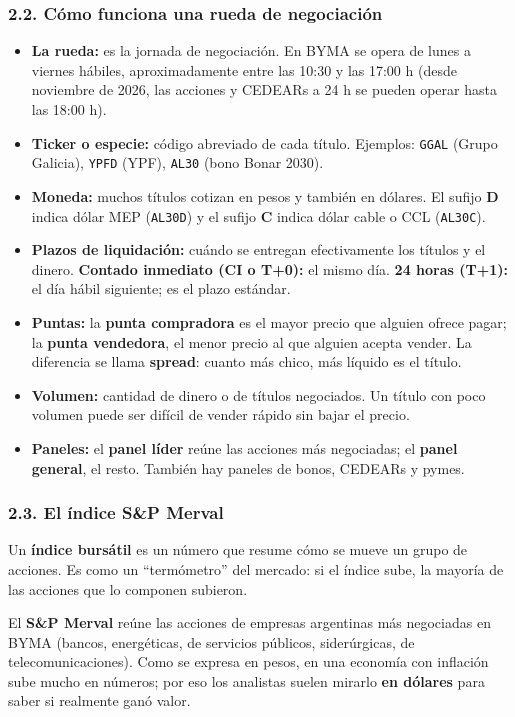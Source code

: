 \subsubsection*{2.2. Cómo funciona una rueda de negociación}
\begin{itemize}
  \item \textbf{La rueda:} es la jornada de negociación. En BYMA se opera de lunes a viernes
        hábiles, aproximadamente entre las 10:30 y las 17:00 h (desde noviembre de 2026, las
        acciones y CEDEARs a 24 h se pueden operar hasta las 18:00 h).
  \item \textbf{Ticker o especie:} código abreviado de cada título. Ejemplos: \texttt{GGAL}
        (Grupo Galicia), \texttt{YPFD} (YPF), \texttt{AL30} (bono Bonar 2030).
  \item \textbf{Moneda:} muchos títulos cotizan en pesos y también en dólares. El sufijo
        \textbf{D} indica dólar MEP (\texttt{AL30D}) y el sufijo \textbf{C} indica dólar cable
        o CCL (\texttt{AL30C}).
  \item \textbf{Plazos de liquidación:} cuándo se entregan efectivamente los títulos y el dinero.
        \textbf{Contado inmediato (CI o T+0):} el mismo día. \textbf{24 horas (T+1):} el día hábil
        siguiente; es el plazo estándar.
  \item \textbf{Puntas:} la \textbf{punta compradora} es el mayor precio que alguien ofrece
        pagar; la \textbf{punta vendedora}, el menor precio al que alguien acepta vender. La
        diferencia se llama \textbf{spread}: cuanto más chico, más líquido es el título.
  \item \textbf{Volumen:} cantidad de dinero o de títulos negociados. Un título con poco volumen
        puede ser difícil de vender rápido sin bajar el precio.
  \item \textbf{Paneles:} el \textbf{panel líder} reúne las acciones más negociadas; el
        \textbf{panel general}, el resto. También hay paneles de bonos, CEDEARs y pymes.
\end{itemize}

\subsubsection*{2.3. El índice S\&P Merval}
Un \textbf{índice bursátil} es un número que resume cómo se mueve un grupo de acciones. Es como
un ``termómetro'' del mercado: si el índice sube, la mayoría de las acciones que lo componen
subieron.

El \textbf{S\&P Merval} reúne las acciones de empresas argentinas más negociadas en BYMA
(bancos, energéticas, de servicios públicos, siderúrgicas, de telecomunicaciones). Como se
expresa en pesos, en una economía con inflación sube mucho en números; por eso los analistas
suelen mirarlo \textbf{en dólares} para saber si realmente ganó valor.

